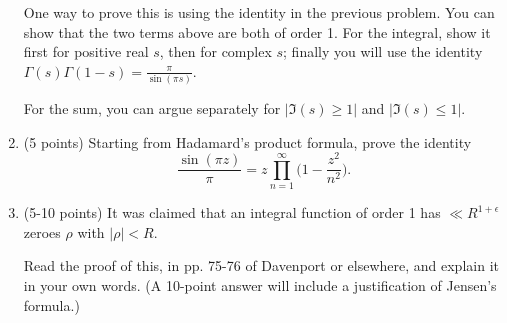 \documentclass[12pt]{article}
\begin{document}
\begin{enumerate}
One way to prove this is using the identity in the previous problem.
You can show that the two terms above are both of order 1. For the integral,
show it first for positive real $s$, then for complex $s$; finally you will
use the identity $\Gamma(s) \Gamma(1 - s) = \frac{\pi}{\sin(\pi s)}$.

For the sum, you can argue separately for $|\Im(s) \geq 1|$ and $|\Im(s) \leq 1|$.

\item(5 points)
Starting from Hadamard's product formula, prove the identity
\begin{equation}
\frac{\sin(\pi z)}{\pi} = z \prod_{n = 1}^{\infty} \bigg(1 - \frac{z^2}{n^2} \bigg).
\end{equation}

\item(5-10 points)
It was claimed that an integral function of order 1 has $\ll R^{1 + \epsilon}$
zeroes $\rho$ with $|\rho| < R$.

Read the proof of this, in pp. 75-76 of Davenport or elsewhere, and explain it in your
own words. (A 10-point answer will include a justification of Jensen's formula.)



\end{enumerate}
\end{document}
